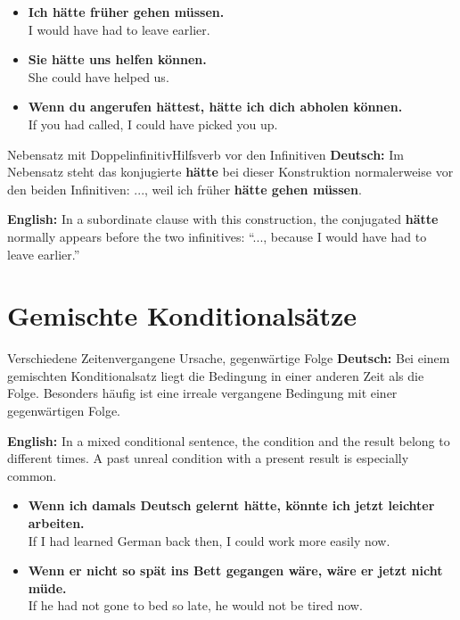 \documentclass[a4paper,11pt]{article}
\newcommand{\GermanText}[1]{\textbf{Deutsch: }#1\par}
\newcommand{\EnglishText}[1]{{\small\color{SoftGray}\textbf{English: }#1\par}}
\newcommand{\ExampleItem}[2]{\item \textbf{#1}\\{\small\color{SoftGray}#2}}
\begin{document}
        \begin{exbox}
            \begin{itemize}
                \ExampleItem{Ich hätte früher gehen müssen.}{I would have had to leave earlier.}
                \ExampleItem{Sie hätte uns helfen können.}{She could have helped us.}
                \ExampleItem{Wenn du angerufen hättest, hätte ich dich abholen können.}{If you had called, I could have picked you up.}
            \end{itemize}
        \end{exbox}

        \begin{grammarentry}{Nebensatz mit Doppelinfinitiv}{Hilfsverb vor den Infinitiven}
            \GermanText{Im Nebensatz steht das konjugierte \textbf{hätte} bei dieser Konstruktion normalerweise vor den beiden Infinitiven: \glqq ..., weil ich früher \textbf{hätte gehen müssen}.\grqq}
            \EnglishText{In a subordinate clause with this construction, the conjugated \textbf{hätte} normally appears before the two infinitives: ``..., because I would have had to leave earlier.''}
        \end{grammarentry}

    \section{Gemischte Konditionalsätze}

        \begin{grammarentry}{Verschiedene Zeiten}{vergangene Ursache, gegenwärtige Folge}
            \GermanText{Bei einem gemischten Konditionalsatz liegt die Bedingung in einer anderen Zeit als die Folge. Besonders häufig ist eine irreale vergangene Bedingung mit einer gegenwärtigen Folge.}
            \EnglishText{In a mixed conditional sentence, the condition and the result belong to different times. A past unreal condition with a present result is especially common.}
        \end{grammarentry}

        \begin{exbox}
            \begin{itemize}
                \ExampleItem{Wenn ich damals Deutsch gelernt hätte, könnte ich jetzt leichter arbeiten.}{If I had learned German back then, I could work more easily now.}
                \ExampleItem{Wenn er nicht so spät ins Bett gegangen wäre, wäre er jetzt nicht müde.}{If he had not gone to bed so late, he would not be tired now.}
            \end{itemize}
        \end{exbox}
\end{document}
